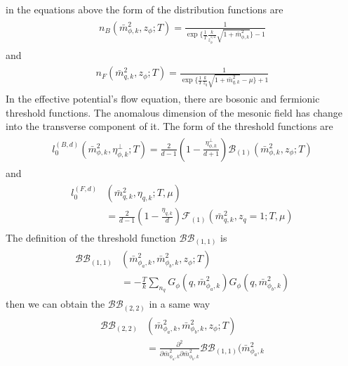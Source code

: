 \documentclass[%
reprint,
superscriptaddress,
showpacs,preprintnumbers,
 amsmath,amssymb,
 aps,
prd,
]{revtex4-1}
\begin{document}
\begin{appendix}
in the equations above the form of the distribution functions are
\begin{align}
\begin{split}
n_B(\bar{m}^{2}_{\phi,k},z_\phi;T)=\frac{1}{\exp\lbrace \frac{1}{T}\frac{k}{z_\phi^{1/2}}\sqrt{1+\bar{m}^{2}_{\phi,k}}
\rbrace-1}
\end{split}
\end{align} 
and
\begin{align}
\begin{split}
n_F(\bar{m}^{2}_{q,k},z_\phi;T)=\frac{1}{\exp\lbrace \frac{1}{T}\frac{k}{z_q}\sqrt{1+\bar{m}^{2}_{q,k}}-\mu 
\rbrace+1}
\end{split}
\end{align} 
In the effective potential's flow equation, there are bosonic and fermionic threshold functions. The anomalous dimension 
of the mesonic field has change into the transverse component of it. The form of the threshold functions are
\begin{align}
\begin{split}
l_0^{(B,d)}(\bar{m}^{2}_{\phi,k},\eta^\bot_{\phi,k};T)=\frac{2}{d-1}\left( 1- \frac{\eta^{\bot}_{\phi,k}}{d+1}\right) 
\mathcal{B}_{(1)}(\bar{m}^{2}_{\phi,k},z_\phi;T)
\end{split}
\end{align} 
and
\begin{align}
\begin{split}
l_0^{(F,d)}&(\bar{m}^{2}_{q,k},\eta_{q,k};T,\mu)\\&=\frac{2}{d-1}\left( 1-\frac{\eta_{q,k}}{d} \right)\mathcal{F}_{(1)}
(\bar{m}^{2}_{q,k},z_q=1;T,\mu)
\end{split}
\end{align} 
The definition of the threshold function $\mathcal{BB}_{(1,1)}$ is
\begin{align}
\begin{split}
\mathcal{BB}_{(1,1)}&(\bar{m}^{2}_{\phi_a,k},\bar{m}^{2}_{\phi_b,k},z_\phi;T)\\
&=-\frac{T}{k}\sum_{n_q}G_\phi(q,\bar{m}^{2}_{\phi_a,k})G_\phi(q,\bar{m}^{2}_{\phi_b,k})
\end{split}
\end{align} 
then we can obtain the $\mathcal{BB}_{(2,2)}$ in a same way
\begin{align}
\begin{split}
\mathcal{BB}_{(2,2)}&(\bar{m}^{2}_{\phi_a,k},\bar{m}^{2}_{\phi_b,k},z_\phi;T)\\
&=\frac{\partial^2}{\partial\bar{m}^{2}_{\phi_a,k}\partial\bar{m}^{2}_{\phi_b,k}}\mathcal{BB}_{(1,1)}(\bar{m}^{2}_{\phi_a,k}

\end{split}
\end{align}
\end{appendix}
\end{document}
